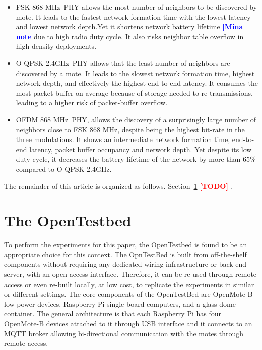 \documentclass[journal]{IEEEtran}
\newcommand{\fsk}          {FSK 868 MHz}
\newcommand{\oqpsk}        {O-QPSK 2.4GHz}
\newcommand{\ofdm}         {OFDM 868 MHz}
\newcommand{\todo}[1]      {\textbf{\textcolor{red}{[TODO] #1}}}
\newcommand{\mina}[1]      {\textbf{\textcolor{blue}{[Mina] #1}}}
\begin{document}
\begin{itemize}
   \item \fsk\ PHY allows the most number of neighbors to be discovered by mote. 
    It leads to the fastest network formation time with the lowest latency and lowest network depth.Yet it shortens network battery lifetime \mina{note} due to high radio duty cycle. 
    It also risks neighbor table overflow in high density deployments.
   
   \item \oqpsk\  PHY allows that the least number of neighbors are discovered by a mote. 
   It leads to the slowest network formation time, highest network depth, and effectively the highest end-to-end latency. 
   It consumes the most packet buffer on average because of storage needed to re-transmissions, leading to a higher risk of packet-buffer overflow. 
   
   \item \ofdm\ PHY, allows the discovery of a surprisingly large number of neighbors close to \fsk, despite being the highest bit-rate in the three modulations. 
   It shows an intermediate network formation time, end-to-end latency, packet buffer occupancy and network depth.
   Yet despite its low duty cycle, it decreases the battery lifetime of the network by more than 65\% compared to \oqpsk.
\end{itemize}
  

The remainder of this article is organized as follows.
Section~\ref{sec:opentested} \todo{}.

\section{The OpenTestbed}
\label{sec:opentested}

To perform the experiments for this paper, the OpenTestbed \cite{munoz19opentestbed} is found to be an appropriate choice for this context.
The OpnTestBed is built from off-the-shelf components without requiring any dedicated wiring infrastructure or back-end server, with an open access interface. 
Therefore, it can be re-used through remote access or even re-built locally, at low cost, to replicate the experiments in similar or different settings.  
The core components of the OpenTestBed are OpenMote B low power devices, Raspberry Pi single-board computers, and a glass dome container.
The general architecture is that each Raspberry Pi has four OpenMote-B devices attached to it through USB interface and it connects to an MQTT broker allowing bi-directional communication with the motes through remote access. 
\end{document}
